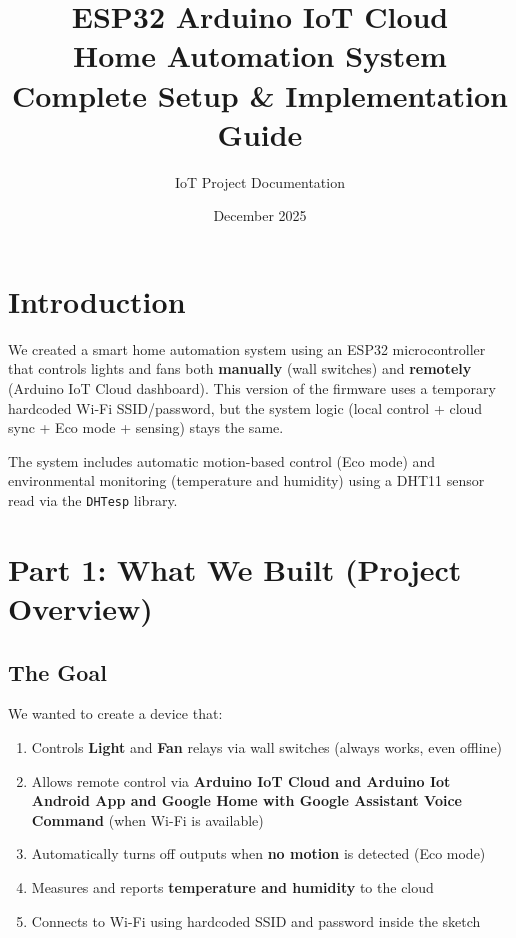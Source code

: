 \documentclass[12pt,a4paper]{article}
\title{\textbf{ESP32 Arduino IoT Cloud} \\ \textbf{Home Automation System} \\ Complete Setup \& Implementation Guide}
\author{IoT Project Documentation}
\date{December 2025}
\begin{document}
\maketitle
\newpage
\tableofcontents
\newpage

\section{Introduction}

We created a smart home automation system using an ESP32 microcontroller that controls lights and fans both \textbf{manually} (wall switches) and \textbf{remotely} (Arduino IoT Cloud dashboard). This version of the firmware uses a temporary hardcoded Wi-Fi SSID/password, but the system logic (local control + cloud sync + Eco mode + sensing) stays the same.

The system includes automatic motion-based control (Eco mode) and environmental monitoring (temperature and humidity) using a DHT11 sensor read via the \texttt{DHTesp} library.

\newpage
\section{Part 1: What We Built (Project Overview)}

\subsection{The Goal}

We wanted to create a device that:

\begin{enumerate}
\item Controls \textbf{Light} and \textbf{Fan} relays via wall switches (always works, even offline)
\item Allows remote control via \textbf{Arduino IoT Cloud and Arduino Iot Android App and Google Home with Google Assistant Voice Command} (when Wi-Fi is available)
\item Automatically turns off outputs when \textbf{no motion} is detected (Eco mode)
\item Measures and reports \textbf{temperature and humidity} to the cloud
\item Connects to Wi-Fi using hardcoded SSID and password inside the sketch
\end{enumerate}
\end{document}
